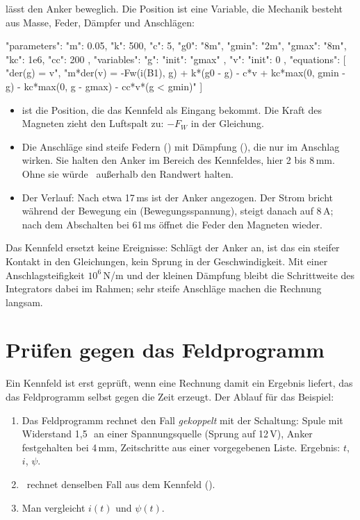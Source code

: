 lässt den Anker beweglich. Die Position ist
eine Variable, die Mechanik besteht aus Masse, Feder, Dämpfer und Anschlägen:

\begin{json}
"parameters": { "m": 0.05, "k": 500, "c": 5, "g0": "8m",
                "gmin": "2m", "gmax": "8m", "kc": 1e6, "cc": 200 },
"variables": { "g": { "init": "gmax" }, "v": { "init": 0 } },
"equations": [
  "der(g) = v",
  "m*der(v) = -Fw(i(B1), g) + k*(g0 - g) - c*v + kc*max(0, gmin - g) - kc*max(0, g - gmax) - cc*v*(g < gmin)"
]
\end{json}

\begin{itemize}
  \item {} ist die Position, die das Kennfeld als Eingang bekommt. Die Kraft
    des Magneten zieht den Luftspalt zu: $-F_W$ in der Gleichung.
  \item Die Anschläge sind steife Federn () mit Dämpfung (),
    die nur im Anschlag wirken. Sie halten den Anker im Bereich des Kennfeldes,
    hier 2 bis 8\,mm. Ohne sie würde \esim\ außerhalb den Randwert halten.
  \item Der Verlauf: Nach etwa 17\,ms ist der Anker angezogen. Der Strom bricht
    während der Bewegung ein (Bewegungsspannung), steigt danach auf 8\,A; nach dem
    Abschalten bei 61\,ms öffnet die Feder den Magneten wieder.
\end{itemize}

\begin{hinweis}
  Das Kennfeld ersetzt keine Ereignisse: Schlägt der Anker an, ist das ein
  steifer Kontakt in den Gleichungen, kein Sprung in der Geschwindigkeit. Mit
  einer Anschlagsteifigkeit $10^6$\,N/m und der kleinen Dämpfung bleibt die
  Schrittweite des Integrators dabei im Rahmen; sehr steife Anschläge machen
  die Rechnung langsam.
\end{hinweis}

\section{Prüfen gegen das Feldprogramm}
\label{sec:kennfeld-pruefen-lauf}

Ein Kennfeld ist erst geprüft, wenn eine Rechnung damit ein Ergebnis liefert, das
das Feldprogramm selbst gegen die Zeit erzeugt. Der Ablauf für das Beispiel:

\begin{enumerate}
  \item Das Feldprogramm rechnet den Fall \emph{gekoppelt} mit der Schaltung:
    Spule mit Widerstand 1,5\,\ohm\ an einer Spannungsquelle (Sprung auf
    12\,V), Anker festgehalten bei 4\,mm, Zeitschritte aus einer vorgegebenen
    Liste. Ergebnis: $t$, $i$, $\psi$.
  \item \esim\ rechnet denselben Fall aus dem Kennfeld
    ().
  \item Man vergleicht $i(t)$ und $\psi(t)$.
\end{enumerate}

